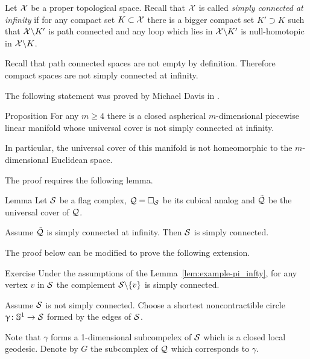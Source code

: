 Let $\mathcal{X}$ be a proper topological space.
Recall that $\mathcal{X}$ is called 
\emph{simply connected at infinity} 
if for any compact set $K\subset\spc X$
there is a bigger compact set $K'\supset K$
such that  $\mathcal{X}\backslash K'$ is path connected 
and any loop which lies in $\mathcal{X}\backslash K'$
is null-homotopic in  $\mathcal{X}\backslash K$.

Recall that path connected spaces are not empty by definition.
Therefore compact spaces are not simply connected at infinity.

The following statement was proved by Michael Davis in \cite{davis-noneuclidean}.

\begin{thm}{Proposition}\label{prop:aspherical}
For any  $m\ge 4$ there is a closed aspherical 
$m$-dimensional piecewise linear manifold
whose universal cover is not simply connected at infinity.

In particular, the universal cover of this manifold 
is not homeomorphic to the $m$-dimensional Euclidean space.
\end{thm}

The proof requires the following lemma.

\begin{thm}{Lemma}\label{lem:example-pi_infty}
Let $\mathcal{S}$ be a flag complex,
$\mathcal{Q}=\square_{\mathcal{S}}$ be its cubical analog
and $\tilde{\mathcal{Q}}$ be the universal cover of $\mathcal{Q}$.

Assume  $\tilde{\mathcal{Q}}$ is simply connected at infinity.
Then $\mathcal{S}$ is simply connected.
\end{thm}

The proof below can be modified to prove the following extension. 

\begin{thm}{Exercise}\label{ex:example-pi_infty-new}
Under the assumptions of the Lemma~\ref{lem:example-pi_infty}, 
for any vertex $v$ in $\mathcal{S}$
the complement $\mathcal{S}\backslash\{v\}$ is simply connected.
\end{thm}


Assume $\mathcal{S}$ is not simply connected.
Choose a shortest noncontractible circle $\gamma\:\mathbb{S}^1\to\spc{S}$ formed by the edges of $\mathcal{S}$.

Note that $\gamma$ forms a 1-dimensional subcompelex of $\mathcal{S}$ which is a closed local geodesic.
Denote by $G$ the subcomplex of $\mathcal{Q}$ which corresponds to $\gamma$.

